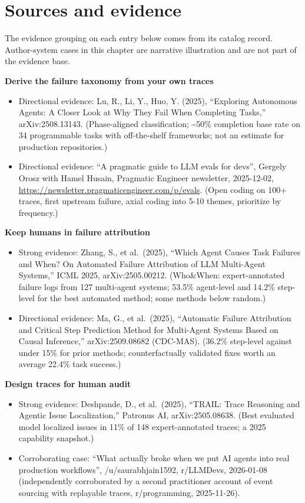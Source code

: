 \section*{Sources and evidence}

The evidence grouping on each entry below comes from its catalog record. Author-system cases in this chapter are narrative illustration and are not part of the evidence base.

\textbf{Derive the failure taxonomy from your own traces}

\begin{itemize}
\tightlist
\item
  Directional evidence: Lu, R., Li, Y., Huo, Y. (2025), ``Exploring Autonomous Agents: A Closer Look at Why They Fail When Completing Tasks,'' arXiv:2508.13143. (Phase-aligned classification; \textasciitilde50\% completion base rate on 34 programmable tasks with off-the-shelf frameworks; not an estimate for production repositories.)
\item
  Directional evidence: ``A pragmatic guide to LLM evals for devs'', Gergely Orosz with Hamel Husain, Pragmatic Engineer newsletter, 2025-12-02, \url{https://newsletter.pragmaticengineer.com/p/evals}. (Open coding on 100+ traces, first upstream failure, axial coding into 5-10 themes, prioritize by frequency.)
\end{itemize}

\textbf{Keep humans in failure attribution}

\begin{itemize}
\tightlist
\item
  Strong evidence: Zhang, S., et al.~(2025), ``Which Agent Causes Task Failures and When? On Automated Failure Attribution of LLM Multi-Agent Systems,'' ICML 2025, arXiv:2505.00212. (Who\&When: expert-annotated failure logs from 127 multi-agent systems; 53.5\% agent-level and 14.2\% step-level for the best automated method; some methods below random.)
\item
  Directional evidence: Ma, G., et al.~(2025), ``Automatic Failure Attribution and Critical Step Prediction Method for Multi-Agent Systems Based on Causal Inference,'' arXiv:2509.08682 (CDC-MAS). (36.2\% step-level against under 15\% for prior methods; counterfactually validated fixes worth an average 22.4\% task success.)
\end{itemize}

\textbf{Design traces for human audit}

\begin{itemize}
\tightlist
\item
  Strong evidence: Deshpande, D., et al.~(2025), ``TRAIL: Trace Reasoning and Agentic Issue Localization,'' Patronus AI, arXiv:2505.08638. (Best evaluated model localized issues in 11\% of 148 expert-annotated traces; a 2025 capability snapshot.)
\item
  Corroborating case: ``What actually broke when we put AI agents into real production workflows'', /u/saurabhjain1592, r/LLMDevs, 2026-01-08 (independently corroborated by a second practitioner account of event sourcing with replayable traces, r/programming, 2025-11-26).
\end{itemize}

